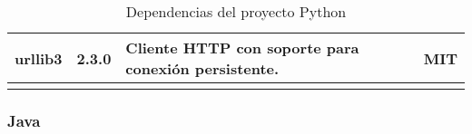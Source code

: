 \begin{longtable}[]{@{}llll@{}}
    \begin{minipage}[t]{0.18\columnwidth}\raggedright\strut urllib3 \strut \end{minipage} & \begin{minipage}[t]{0.10\columnwidth}\raggedright\strut 2.3.0 \strut \end{minipage} & \begin{minipage}[t]{0.49\columnwidth}\raggedright\strut Cliente HTTP con soporte para conexión persistente. \strut \end{minipage} & \begin{minipage}[t]{0.11\columnwidth}\raggedright\strut MIT \strut \end{minipage} \tabularnewline

    \bottomrule
    \caption{Dependencias del proyecto Python}
\end{longtable}


\subsubsection{Java}

